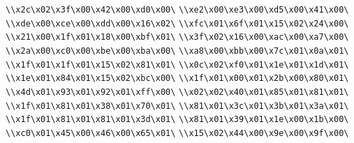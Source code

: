 \verb|\\x2c\x02\x3f\x00\x42\x00\xd0\x00\|\newline
\verb|\\xe2\x00\xe3\x00\xd5\x00\x41\x00\|\newline
\verb|\\xde\x00\xce\x00\xdd\x00\x16\x02\|\newline
\verb|\\xfc\x01\x6f\x01\x15\x02\x24\x00\|\newline
\verb|\\x21\x00\x1f\x01\x18\x00\xbf\x01\|\newline
\verb|\\x3f\x02\x16\x00\xac\x00\xa7\x00\|\newline
\verb|\\x2a\x00\xc0\x00\xbe\x00\xba\x00\|\newline
\verb|\\xa8\x00\xbb\x00\x7c\x01\x0a\x01\|\newline
\verb|\\x1f\x01\x1f\x01\x15\x02\x81\x01\|\newline
\verb|\\x0c\x02\xf0\x01\x1e\x01\x1d\x01\|\newline
\verb|\\x1e\x01\x84\x01\x15\x02\xbc\x00\|\newline
\verb|\\x1f\x01\x00\x01\x2b\x00\x80\x01\|\newline
\verb|\\x4d\x01\x93\x01\x92\x01\xff\x00\|\newline
\verb|\\x02\x02\x40\x01\x85\x01\x81\x01\|\newline
\verb|\\x1f\x01\x81\x01\x38\x01\x70\x01\|\newline
\verb|\\x81\x01\x3c\x01\x3b\x01\x3a\x01\|\newline
\verb|\\x1f\x01\x81\x01\x81\x01\x3d\x01\|\newline
\verb|\\x81\x01\x39\x01\x1e\x00\x1b\x00\|\newline
\verb|\\xc0\x01\x45\x00\x46\x00\x65\x01\|\newline
\verb|\\x15\x02\x44\x00\x9e\x00\x9f\x00\|\newline
